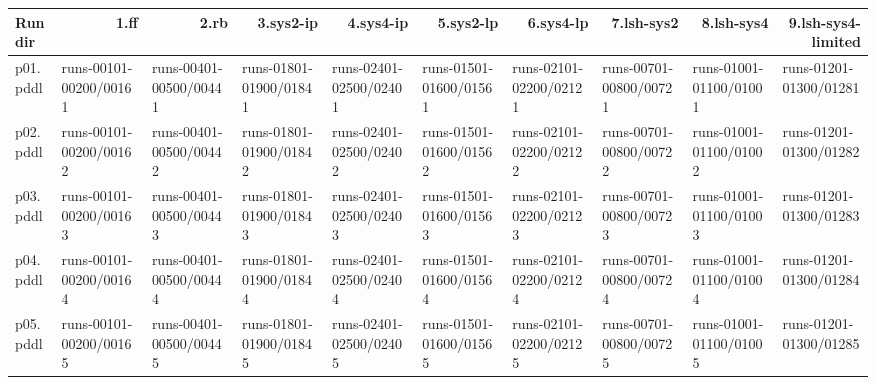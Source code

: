 \documentclass{article}
\begin{document}
\begin{tabular}{@{}lrrrrrrrrr@{}}
Run dir & 1.ff & 2.rb & 3.sys2-ip & 4.sys4-ip & 5.sys2-lp & 6.sys4-lp & 7.lsh-sys2 & 8.lsh-sys4 & 9.lsh-sys4-limited \\
\midrule
p01.pddl & \multicolumn{1}{|l|}{runs-00101-00200/00161} & \multicolumn{1}{|l|}{runs-00401-00500/00441} & \multicolumn{1}{|l|}{runs-01801-01900/01841} & \multicolumn{1}{|l|}{runs-02401-02500/02401} & \multicolumn{1}{|l|}{runs-01501-01600/01561} & \multicolumn{1}{|l|}{runs-02101-02200/02121} & \multicolumn{1}{|l|}{runs-00701-00800/00721} & \multicolumn{1}{|l|}{runs-01001-01100/01001} & \multicolumn{1}{|l|}{runs-01201-01300/01281} \\
p02.pddl & \multicolumn{1}{|l|}{runs-00101-00200/00162} & \multicolumn{1}{|l|}{runs-00401-00500/00442} & \multicolumn{1}{|l|}{runs-01801-01900/01842} & \multicolumn{1}{|l|}{runs-02401-02500/02402} & \multicolumn{1}{|l|}{runs-01501-01600/01562} & \multicolumn{1}{|l|}{runs-02101-02200/02122} & \multicolumn{1}{|l|}{runs-00701-00800/00722} & \multicolumn{1}{|l|}{runs-01001-01100/01002} & \multicolumn{1}{|l|}{runs-01201-01300/01282} \\
p03.pddl & \multicolumn{1}{|l|}{runs-00101-00200/00163} & \multicolumn{1}{|l|}{runs-00401-00500/00443} & \multicolumn{1}{|l|}{runs-01801-01900/01843} & \multicolumn{1}{|l|}{runs-02401-02500/02403} & \multicolumn{1}{|l|}{runs-01501-01600/01563} & \multicolumn{1}{|l|}{runs-02101-02200/02123} & \multicolumn{1}{|l|}{runs-00701-00800/00723} & \multicolumn{1}{|l|}{runs-01001-01100/01003} & \multicolumn{1}{|l|}{runs-01201-01300/01283} \\
p04.pddl & \multicolumn{1}{|l|}{runs-00101-00200/00164} & \multicolumn{1}{|l|}{runs-00401-00500/00444} & \multicolumn{1}{|l|}{runs-01801-01900/01844} & \multicolumn{1}{|l|}{runs-02401-02500/02404} & \multicolumn{1}{|l|}{runs-01501-01600/01564} & \multicolumn{1}{|l|}{runs-02101-02200/02124} & \multicolumn{1}{|l|}{runs-00701-00800/00724} & \multicolumn{1}{|l|}{runs-01001-01100/01004} & \multicolumn{1}{|l|}{runs-01201-01300/01284} \\
p05.pddl & \multicolumn{1}{|l|}{runs-00101-00200/00165} & \multicolumn{1}{|l|}{runs-00401-00500/00445} & \multicolumn{1}{|l|}{runs-01801-01900/01845} & \multicolumn{1}{|l|}{runs-02401-02500/02405} & \multicolumn{1}{|l|}{runs-01501-01600/01565} & \multicolumn{1}{|l|}{runs-02101-02200/02125} & \multicolumn{1}{|l|}{runs-00701-00800/00725} & \multicolumn{1}{|l|}{runs-01001-01100/01005} & \multicolumn{1}{|l|}{runs-01201-01300/01285} \\

\end{tabular}
\end{document}
